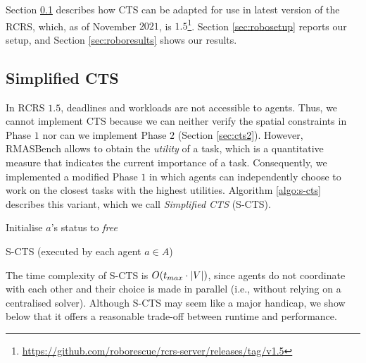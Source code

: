 Section \ref{sec:s-cts} describes how CTS can be adapted for use in latest version of the
RCRS, which, as of November $2021$, is
$1.5$\footnote{\url{https://github.com/roborescue/rcrs-server/releases/tag/v1.5}}.
Section \ref{sec:robosetup} reports our setup, and Section \ref{sec:roboresults} shows our
results.

\subsection{Simplified CTS}\label{sec:s-cts}

In RCRS $1.5$, deadlines and workloads are not accessible to agents. Thus, we cannot
implement CTS because we can neither verify the spatial constraints in Phase $1$ nor can
we implement Phase $2$ (Section \ref{sec:cts2}). However, RMASBench allows to obtain the
\emph{utility} of a task, which is a quantitative measure that indicates the current
importance of a task.
Consequently, we implemented a modified Phase $1$ in which agents can independently
choose to work on the closest tasks with the highest utilities. Algorithm \ref{algo:s-cts}
describes this variant, which we call \emph{Simplified CTS} (S-CTS).

\begin{algorithm}[t]
    \DontPrintSemicolon
    Initialise $a$'s status to \emph{free}\;
    \caption{S-CTS (executed by each agent $a \in A$)\label{algo:s-cts}}
\end{algorithm}

The time complexity of S-CTS is $O(t_{max} \cdot |V|)$, since agents do not coordinate with
each other and their choice is made in parallel (i.e., without relying on a centralised
solver). Although S-CTS may seem like a major handicap, we show below that it offers a
reasonable trade-off between runtime and performance.

